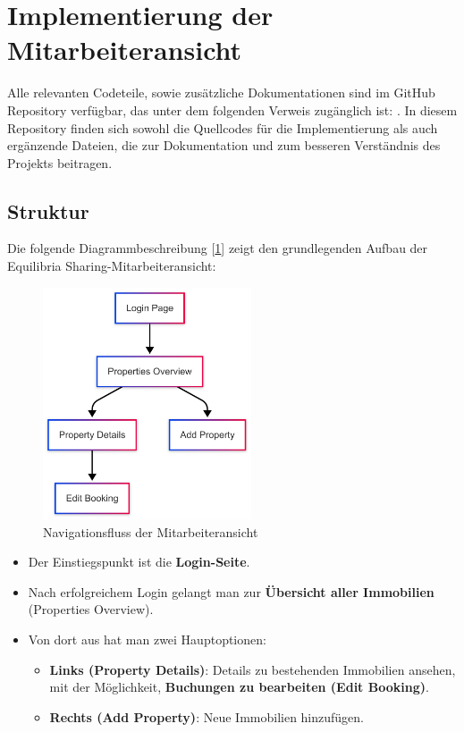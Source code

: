  \section{Implementierung der Mitarbeiteransicht}

Alle relevanten Codeteile, sowie zusätzliche Dokumentationen sind im GitHub Repository verfügbar, das unter dem folgenden Verweis zugänglich ist: \textit{\cite{equilibriaSharingFrontend}}. In diesem Repository finden sich sowohl
die Quellcodes für die Implementierung als auch ergänzende Dateien, die zur Dokumentation und zum besseren Verständnis des Projekts beitragen.

\subsection{Struktur}
Die folgende Diagrammbeschreibung [\ref{fig:navigationsfluss}] zeigt den grundlegenden Aufbau der Equilibria Sharing-Mitarbeiteransicht:

\begin{figure}
	\centering
	\includegraphics[width=0.55\textwidth]{images/StrukturDiagramm.png}
	\caption{Navigationsfluss der Mitarbeiteransicht}
	\label{fig:navigationsfluss}
\end{figure}

\begin{itemize}
	\item Der Einstiegspunkt ist die \textbf{Login-Seite}.
	\item Nach erfolgreichem Login gelangt man zur \textbf{Übersicht aller Immobilien} (Properties Overview).
	\item Von dort aus hat man zwei Hauptoptionen:
	\begin{itemize}
		\item \textbf{Links (Property Details)}: Details zu bestehenden Immobilien ansehen, mit der Möglichkeit, \textbf{Buchungen zu bearbeiten (Edit Booking)}.
		\item \textbf{Rechts (Add Property)}: Neue Immobilien hinzufügen.
	\end{itemize}
\end{itemize}


